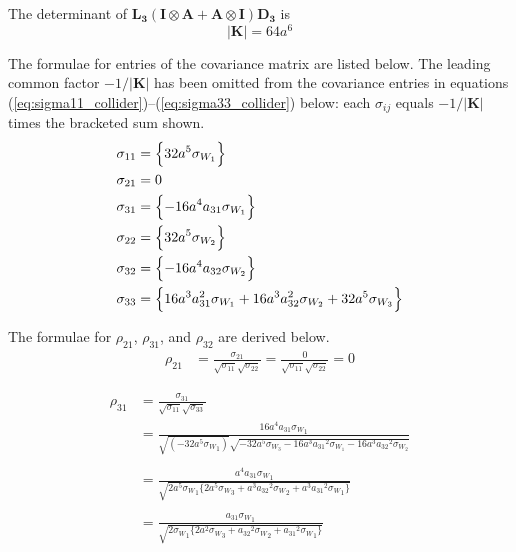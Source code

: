 \documentclass{article}
\begin{document}
The determinant of $\mathbf{L_3}(\mathbf{I} \otimes \mathbf{A} + \mathbf{A} \otimes \mathbf{I}) \mathbf{D_3}$ is
\begin{equation}
|\mathbf{K}| = 64a^6
\end{equation}

The formulae for entries of the covariance matrix are listed below.
The leading common factor $-1/|\mathbf{K}|$ has been omitted from the
covariance entries in equations
(\ref{eq:sigma11_collider})--(\ref{eq:sigma33_collider}) below: each
$\sigma_{ij}$ equals $-1/|\mathbf{K}|$ times the bracketed sum shown.
\begin{align}
\sigma_{11}&= \Bigl\{ 32a^5\sigma_{W_{1}} \Bigr\} \label{eq:sigma11_collider} \\
\sigma_{21}&= 0 \label{eq:sigma21_collider} \\
\sigma_{31}&= \Bigl\{ -16a^4a_{31}\sigma_{W_{1}} \Bigr\} \label{eq:sigma31_collider} \\
\sigma_{22}&= \Bigl\{ 32a^5\sigma_{W_{2}} \Bigr\} \label{eq:sigma22_collider} \\
\sigma_{32}&= \Bigl\{ -16a^4a_{32}\sigma_{W_{2}} \Bigr\} \label{eq:sigma32_collider} \\
\sigma_{33}&= \Bigl\{ 16a^3a_{31}^2\sigma_{W_{1}}+16a^3a_{32}^2\sigma_{W_{2}}+32a^5\sigma_{W_{3}} \Bigr\} \label{eq:sigma33_collider}
\end{align}

The formulae for $\rho_{21}$, $\rho_{31}$, and $\rho_{32}$ are derived below.
\begin{equation}
\begin{aligned}
\rho_{21}&=\frac{\sigma_{21}}{\sqrt{\sigma_{11}} \sqrt{\sigma_{22}}}=\frac{0}{\sqrt{\sigma_{11}} \sqrt{\sigma_{22}}}=0
\end{aligned}
\end{equation}

\begin{equation}
\begin{aligned}
\rho_{31}&=\frac{\sigma_{31}}{\sqrt{\sigma_{11}} \sqrt{\sigma_{33}}} \\
&=\frac{ 16a^4a_{31} {\sigma_{W}}_{1}} {\sqrt{ \left( - 32a^5{\sigma_{W}}_{1} \right) } \sqrt{ -32a^5{\sigma_{W_{3}}}-16a^3{a_{31}}^2{\sigma_{W_{1}}}-16a^3{a_{32}}^2{\sigma_{W_{2}}}  }} \\
\\
&=\frac{a^4a_{31}{\sigma_{W}}_{1}}{\sqrt{ 2 a^5{\sigma_{W}}_{1} \{ 2 a^5{\sigma_{W}}_{3} + a^3{a_{32}}^2{\sigma_{W}}_{2} +  a^3{a_{31}}^2 {\sigma_{W}}_{1} \} }  } \\
\\
&=\frac{ a_{31}{\sigma_{W}}_{1}}{\sqrt{ 2 {\sigma_{W}}_{1} \{  2a^2{\sigma_{W}}_{3} +  {a_{32}}^2{\sigma_{W}}_{2} +{a_{31}}^2 {\sigma_{W}}_{1} \} }  }
\end{aligned}
\end{equation}
\end{document}
